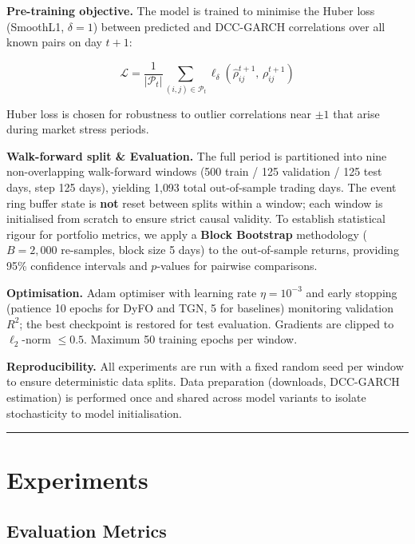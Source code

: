 \documentclass[runningheads]{llncs}
\begin{document}
\textbf{Pre-training objective.} The model is trained to minimise the Huber loss (SmoothL1, $\delta = 1$) between predicted and DCC-GARCH correlations over all known pairs on day $t+1$:

\begin{equation}
\mathcal{L} = \frac{1}{|\mathcal{P}_t|} \sum_{(i,j) \in \mathcal{P}_t}
\ell_\delta\!\left(\hat{\rho}_{ij}^{t+1},\, \rho_{ij}^{t+1}\right)
\end{equation}

Huber loss is chosen for robustness to outlier correlations near $\pm 1$ that arise during market stress periods.

\textbf{Walk-forward split \& Evaluation.} The full period is partitioned into nine non-overlapping walk-forward windows (500 train / 125 validation / 125 test days, step 125 days), yielding 1{,}093 total out-of-sample trading days. The event ring buffer state is \textbf{not} reset between splits within a window; each window is initialised from scratch to ensure strict causal validity. To establish statistical rigour for portfolio metrics, we apply a \textbf{Block Bootstrap} methodology ($B = 2{,}000$ re-samples, block size 5 days) to the out-of-sample returns, providing 95\% confidence intervals and $p$-values for pairwise comparisons.

\textbf{Optimisation.} Adam optimiser with learning rate $\eta = 10^{-3}$ and early stopping (patience 10 epochs for DyFO and TGN, 5 for baselines) monitoring validation $R^2$; the best checkpoint is restored for test evaluation. Gradients are clipped to $\ell_2$-norm $\leq 0.5$. Maximum 50 training epochs per window.

\textbf{Reproducibility.} All experiments are run with a fixed random seed per window to ensure deterministic data splits. Data preparation (downloads, DCC-GARCH estimation) is performed once and shared across model variants to isolate stochasticity to model initialisation.

\begin{center}\rule{0.5\linewidth}{0.5pt}\end{center}

\section{Experiments}\label{sec:experiments}

\subsection{Evaluation Metrics}\label{evaluation-metrics}
\end{document}
